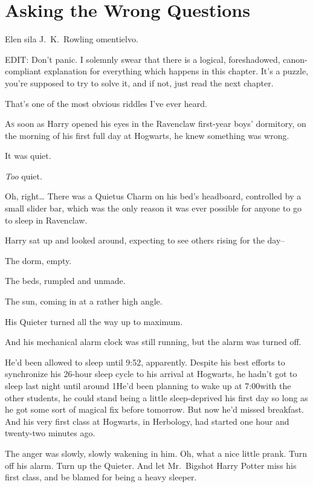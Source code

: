 \chapter{Asking the Wrong Questions}

\begin{chapterOpeningAuthorNote}
Elen sila J.~K.~Rowling omentielvo.

EDIT: Don't panic. I solemnly swear that there is a logical, foreshadowed, canon-compliant explanation for everything which happens in this chapter. It's a puzzle, you're supposed to try to solve it, and if not, just read the next chapter.
\end{chapterOpeningAuthorNote}
\begin{chapterOpeningQuote}
That's one of the most obvious riddles I've ever heard.
\end{chapterOpeningQuote}

\lettrine{A}{s} soon as Harry opened his eyes in the Ravenclaw first-year boys' dormitory, on the morning of his first full day at Hogwarts, he knew something was wrong.

It was quiet.

\emph{Too} quiet.

Oh, right{\ldots} There was a Quietus Charm on his bed's headboard, controlled by a small slider bar, which was the only reason it was ever possible for anyone to go to sleep in Ravenclaw.

Harry sat up and looked around, expecting to see others rising for the day\---

The dorm, empty.

The beds, rumpled and unmade.

The sun, coming in at a rather high angle.

His Quieter turned all the way up to maximum.

And his mechanical alarm clock was still running, but the alarm was turned off.

He'd been allowed to sleep until 9:52\am, apparently. Despite his best efforts to synchronize his 26-hour sleep cycle to his arrival at Hogwarts, he hadn't got to sleep last night until around 1\am He'd been planning to wake up at 7:00\am with the other students, he could stand being a little sleep-deprived his first day so long as he got some sort of magical fix before tomorrow. But now he'd missed breakfast. And his very first class at Hogwarts, in Herbology, had started one hour and twenty-two minutes ago.

The anger was slowly, slowly wakening in him. Oh, what a nice little prank. Turn off his alarm. Turn up the Quieter. And let Mr.~Bigshot Harry Potter miss his first class, and be blamed for being a heavy sleeper.

